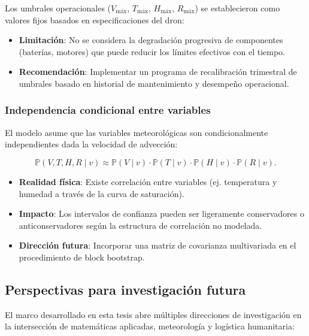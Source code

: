 \documentclass[
  spanish,
  us-letterpaper,
]{scrreprt}
\providecommand{\tightlist}{%
  \setlength{\itemsep}{0pt}\setlength{\parskip}{0pt}}
\numberwithin{equation}{section}
\begin{document}
Los umbrales operacionales (\(V_{\text{máx}}\), \(T_{\text{máx}}\),
\(H_{\text{máx}}\), \(R_{\text{máx}}\)) se establecieron como valores
fijos basados en especificaciones del dron:

\begin{itemize}
\tightlist
\item
  \textbf{Limitación}: No se considera la degradación progresiva de
  componentes (baterías, motores) que puede reducir los límites
  efectivos con el tiempo.
\item
  \textbf{Recomendación}: Implementar un programa de recalibración
  trimestral de umbrales basado en historial de mantenimiento y
  desempeño operacional.
\end{itemize}

\subsubsection*{Independencia condicional entre
variables}\label{independencia-condicional-entre-variables}

El modelo asume que las variables meteorológicas son condicionalmente
independientes dada la velocidad de advección:

\[
\mathbb{P}(V, T, H, R \mid v) \approx \mathbb{P}(V \mid v) \cdot \mathbb{P}(T \mid v) \cdot \mathbb{P}(H \mid v) \cdot \mathbb{P}(R \mid v).
\]

\begin{itemize}
\tightlist
\item
  \textbf{Realidad física}: Existe correlación entre variables (ej.
  temperatura y humedad a través de la curva de saturación).
\item
  \textbf{Impacto}: Los intervalos de confianza pueden ser ligeramente
  conservadores o anticonservadores según la estructura de correlación
  no modelada.
\item
  \textbf{Dirección futura}: Incorporar una matriz de covarianza
  multivariada en el procedimiento de block bootstrap.
\end{itemize}

\subsection{Perspectivas para investigación
futura}\label{perspectivas-para-investigaciuxf3n-futura}

El marco desarrollado en esta tesis abre múltiples direcciones de
investigación en la intersección de matemáticas aplicadas, meteorología
y logística humanitaria:
\end{document}

